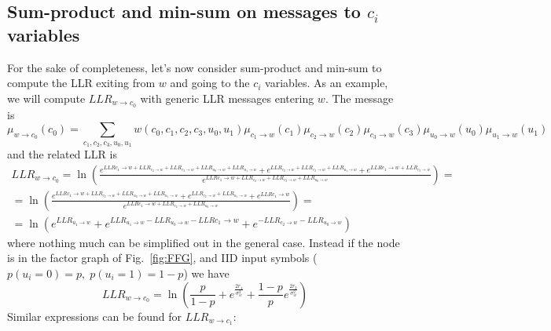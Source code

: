 \documentclass[10pt]{article}
\begin{document}
\subsection*{Sum-product and min-sum on messages to $c_i$ variables}
For the sake of completeness, let's now consider sum-product and min-sum to compute the LLR exiting from $w$ and going to the $c_i$ variables. As an example, we will compute $LLR_{w \rightarrow c_0}$ with generic LLR messages entering $w$.
The message is
\begin{equation}
	\mu_{w \rightarrow c_0}(c_0) = \sum_{c_1, c_2, c_3, u_0, u_1} w(c_0, c_1, c_2, c_3, u_0, u_1) \mu_{c_1 \rightarrow w}(c_1)\mu_{c_2 \rightarrow w}(c_2)\mu_{c_3 \rightarrow w}(c_3)\mu_{u_0 \rightarrow w}(u_0)\mu_{u_1 \rightarrow w}(u_1)
\end{equation}
and the related LLR is
\begin{multline}
	LLR_{w \rightarrow c_0} = \ln\left(
									\frac{e^{LLR{c_1 \rightarrow w}+LLR_{c_2 \rightarrow w}+LLR_{c_3 \rightarrow w}+LLR_{u_0 \rightarrow w}+LLR_{u_1 \rightarrow w}}+e^{LLR_{c_2 \rightarrow w}+LLR_{c_3 \rightarrow w}+LLR_{u_1 \rightarrow w}}+e^{LLR{c_1 \rightarrow w}+LLR_{c_3 \rightarrow w}}}
									{e^{LLR{c_1 \rightarrow w}+LLR_{c_2 \rightarrow w}+LLR_{c_3 \rightarrow w}+LLR_{u_0 \rightarrow w}}}
								\right) = \\
							= \ln\left(
									\frac{e^{LLR{c_1 \rightarrow w}+LLR_{c_2 \rightarrow w}+LLR_{u_0 \rightarrow w}+LLR_{u_1 \rightarrow w}}+e^{LLR_{c_2 \rightarrow w}+LLR_{u_1 \rightarrow w}}+e^{LLR{c_1 \rightarrow w}}}
									{e^{LLR{c_1 \rightarrow w}+LLR_{c_2 \rightarrow w}+LLR_{u_0 \rightarrow w}}}
								\right) = \\
							= \ln\left(e^{LLR_{u_1 \rightarrow w}} + e^{LLR_{u_1 \rightarrow w} - LLR_{u_0 \rightarrow w} - LLR{c_1 \rightarrow w}} + e^{-LLR_{c_2 \rightarrow w}-LLR_{u_0 \rightarrow w}} \right)
\end{multline}
where nothing much can be simplified out in the general case. Instead if the node is in the factor graph of Fig.~\ref{fig:FFG}, and IID input symbols ($p(u_i = 0) = p, \; p(u_i = 1) = 1 - p$) we have
\begin{equation}
	LLR_{w \rightarrow c_0} = \ln\left(\frac{p}{1-p} + e^{\frac{2r_1}{\sigma_w^2}} + \frac{1-p}{p}e^{\frac{2r_2}{\sigma_w^2}} \right)
\end{equation}
Similar expressions can be found for $LLR_{w \rightarrow c_1}$:
\end{document}
